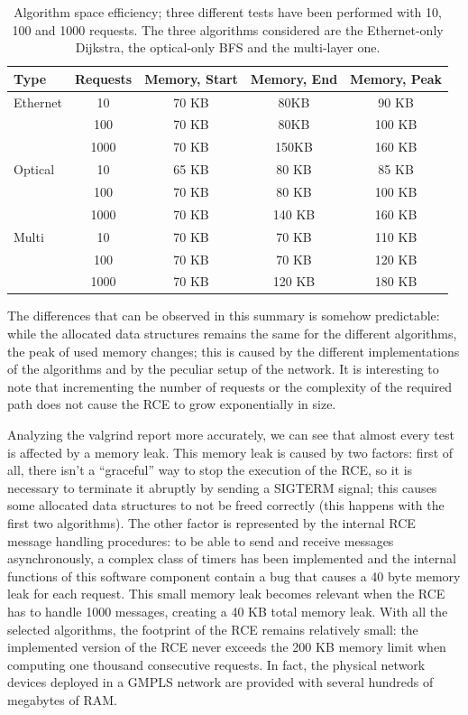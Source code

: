 \documentclass[10pt,a4paper]{report}
\begin{document}
\begin{table}[!htbp]
  \begin{center}
    \begin{tabular}{|l|c|c|c|c|}
      \hline
      \textbf{Type} & \textbf{Requests} & \textbf{Memory, Start}
      & \textbf{Memory, End} & \textbf{Memory, Peak} \\ \hline
      Ethernet & 10 & 70 KB & 80KB & 90 KB \\
      & 100 & 70 KB & 80KB & 100 KB \\
      & 1000 & 70 KB & 150KB & 160 KB \\ \hline
      Optical & 10 & 65 KB & 80 KB & 85 KB \\
      & 100 & 70 KB & 80 KB & 100 KB \\
      & 1000 & 70 KB & 140 KB & 160 KB \\ \hline
      Multi & 10 & 70 KB & 70 KB & 110 KB \\
      & 100 & 70 KB & 70 KB & 120 KB \\
      & 1000 & 70 KB & 120 KB & 180 KB \\
      \hline
    \end{tabular}
    \caption[Algorithm space efficiency]{Algorithm space efficiency;
      three different tests have been performed with 10, 100 and 1000
      requests. The three algorithms considered are the Ethernet-only
      Dijkstra, the optical-only BFS and the multi-layer one.}
    \label{tab:test_eth}
  \end{center}
\end{table}

The differences that can be observed in this summary is somehow
predictable: while the allocated data structures remains the same for
the different algorithms, the peak of used memory changes; this is
caused by the different implementations of the algorithms and by the
peculiar setup of the network. It is interesting to note that
incrementing the number of requests or the complexity of the required
path does not cause the RCE to grow exponentially in size.

Analyzing the valgrind report more accurately, we can see that almost
every test is affected by a memory leak. This memory leak is caused by
two factors: first of all, there isn't a ``graceful'' way to stop the
execution of the RCE, so it is necessary to terminate it abruptly by
sending a SIGTERM signal; this causes some allocated data structures
to not be freed correctly (this happens with the first two
algorithms). The other factor is represented by the internal RCE
message handling procedures: to be able to send and receive messages
asynchronously, a complex class of timers has been implemented and the
internal functions of this software component contain a bug that
causes a 40 byte memory leak for each request. This small memory leak
becomes relevant when the RCE has to handle 1000 messages, creating a
40 KB total memory leak. With all the selected algorithms, the
footprint of the RCE remains relatively small: the implemented version
of the RCE never exceeds the 200 KB memory limit when computing one
thousand consecutive requests. In fact, the physical network devices
deployed in a GMPLS network are provided with several hundreds of
megabytes of RAM.
\end{document}
